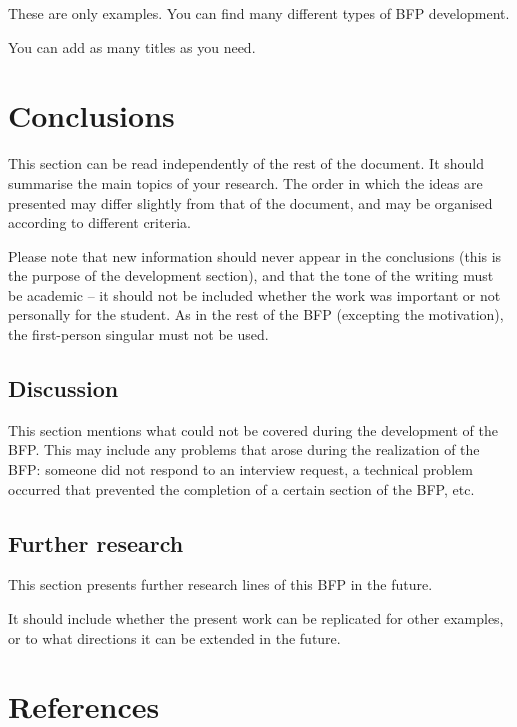 \documentclass[english]{utad-tfg}
\begin{document}
These are only examples. You can find many different types of BFP
development.

You can add as many titles as you need.

\section{}

\chapter{Conclusions}

This section can be read independently of the rest of the document. It
should summarise the main topics of your research. The order in which the
ideas are presented may differ slightly from that of the document, and may
be organised according to different criteria.

Please note that new information should never appear in the conclusions
(this is the purpose of the development section), and that the tone of the
writing must be academic -- it should not be included whether the work was
important or not personally for the student. As in the rest of the BFP
(excepting the motivation), the first-person singular must not be used.

\section{Discussion}
This section mentions what could not be covered during the development of
the BFP. This may include any problems that arose during the realization of
the BFP: someone did not respond to an interview request, a technical
problem occurred that prevented the completion of a certain section of the
BFP, etc.

\section{Further research}
This section presents further research lines of this BFP in the future.

It should include whether the present work can be replicated for other
examples, or to what directions it can be extended in the future.

\chapter{References}
\end{document}
